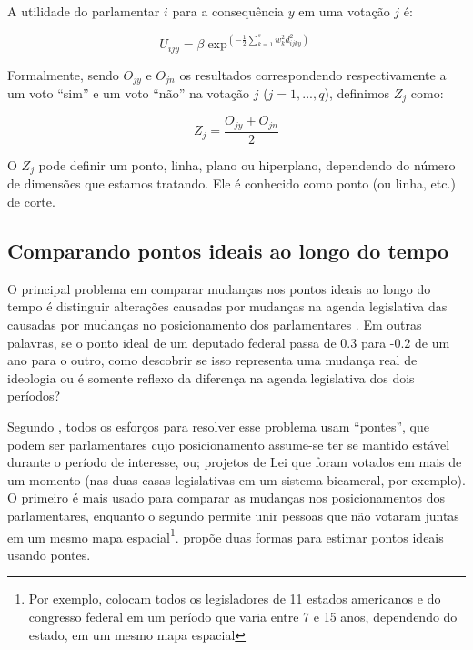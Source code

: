 \documentclass[a4paper,titlepage]{ppgi}\usepackage[]{graphicx}\usepackage[]{color}
\begin{document}
A utilidade do parlamentar $i$ para a consequência $y$ em uma votação $j$ é:

\begin{equation}
  U_{ijy} = \beta \exp^{\left( - \frac{1}{2} \sum\limits_{k=1}^s w_k^2 d_{ijky}^2 \right)}
\end{equation}

Formalmente, sendo $O_{jy}$ e $O_{jn}$ os resultados correspondendo
respectivamente a um voto ``sim'' e um voto ``não'' na votação $j$ ($j = 1,
..., q$), definimos $Z_j$ como: 

\begin{equation}\label{eq:cutpoint}
  Z_j = \frac{O_{jy} + O_{jn}}{2}
\end{equation}

O $Z_j$ pode definir um ponto, linha, plano ou hiperplano, dependendo do número
de dimensões que estamos tratando. Ele é conhecido como ponto (ou linha, etc.)
de corte.







\subsection{Comparando pontos ideais ao longo do tempo}
\label{cap:fundamentacao:comparando-pontos-ideais-no-tempo}

O principal problema em comparar mudanças nos pontos ideais ao longo do tempo é
distinguir alterações causadas por mudanças na agenda legislativa das causadas
por mudanças no posicionamento dos parlamentares \cite{Bailey2007}. Em outras
palavras, se o ponto ideal de um deputado federal passa de 0.3 para -0.2 de um ano
para o outro, como descobrir se isso representa uma mudança real de ideologia ou
é somente reflexo da diferença na agenda legislativa dos dois períodos?

Segundo , todos os esforços para resolver esse problema
usam ``pontes'', que podem ser parlamentares cujo posicionamento assume-se ter
se mantido estável durante o período de interesse, ou; projetos de Lei que
foram votados em mais de um momento (nas duas casas legislativas em um sistema
bicameral, por exemplo). O primeiro é mais usado para comparar as mudanças nos
posicionamentos dos parlamentares, enquanto o segundo permite unir pessoas que
não votaram juntas em um mesmo mapa espacial\footnote{Por exemplo,
 colocam todos os legisladores de 11 estados americanos e
do congresso federal em um período que varia entre 7 e 15 anos, dependendo do
estado, em um mesmo mapa espacial}.  propõe duas formas
para estimar pontos ideais usando pontes.
\end{document}
